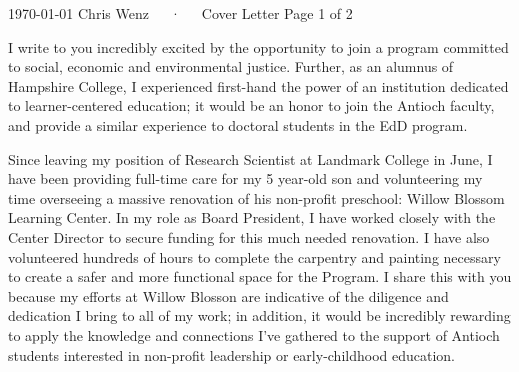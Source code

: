 \documentclass[11pt, a4paper]{awesome-cv}
\begin{document}
\makecvheader[C]

\makecvfooter
  {\today}
  {Chris Wenz~~~·~~~Cover Letter}
  {Page 1 of 2}

\makelettertitle

\begin{cvletter}

I write to you incredibly excited by the opportunity to join a program committed to social, economic and environmental justice. Further, as an alumnus of Hampshire College, I experienced first-hand the power of an institution dedicated to learner-centered education; it would be an honor to join the Antioch faculty, and provide a similar experience to doctoral students in the EdD program. 

Since leaving my position of Research Scientist at Landmark College in June, I have been providing full-time care for my 5 year-old son and volunteering my time overseeing a massive renovation of his non-profit preschool: Willow Blossom Learning Center. In my role as Board President, I have worked closely with the Center Director to secure funding for this much needed renovation. I have also volunteered hundreds of hours to complete the carpentry and painting necessary to create a safer and more functional space for the Program. I share this with you because my efforts at Willow Blosson are indicative of the diligence and dedication I bring to all of my work; in addition, it would be incredibly rewarding to apply the knowledge and connections I've gathered to the support of Antioch students interested in non-profit leadership or early-childhood education. 


\end{cvletter}
\end{document}
